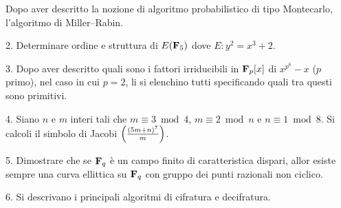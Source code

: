  Dopo aver descritto la nozione di algoritmo probabilistico di tipo Montecarlo, l'algoritmo di Miller--Rabin.  
\ve\vs

\item{2.} Determinare ordine e struttura di $E({\bf F}_5)$ dove $E: y^2=x^3+2$.\vv

\item{3.} Dopo aver descritto quali sono i fattori irriducibili in ${\bf F}_p[x]$ di $x^{p^6}-x$ ($p$ primo), nel caso in cui $p=2$, li
si elenchino tutti specificando quali tra questi sono primitivi.\vv

\item{4.} Siano $n$ e $m$ interi tali che $m\equiv3\bmod4$, $m\equiv2\bmod n$ e $n\equiv1\bmod8$. Si calcoli il simbolo di Jacobi
$\left({(5m+n)^7\over m}\right)$.\ve \vs

\item{5.} Dimostrare che se ${\bf F}_q$ \`e un campo finito di caratteristica dispari,
allor esiste sempre una curva ellittica su ${\bf F}_q$ con gruppo dei punti razionali non ciclico.
\vv\vv

\item{6.} Si descrivano i principali algoritmi di cifratura e decifratura.
\ \vst

 \bye
